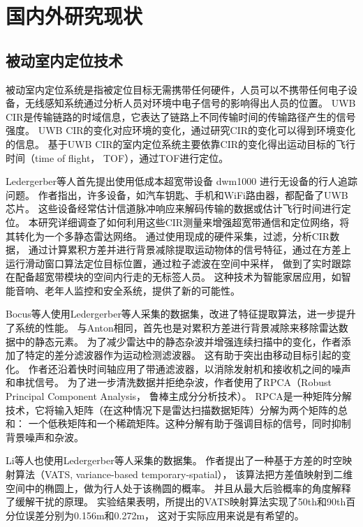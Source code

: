 \section{国内外研究现状}

\subsection{被动室内定位技术}
被动室内定位系统是指被定位目标无需携带任何硬件，人员可以不携带任何电子设备，无线感知系统通过分析人员对环境中电子信号的影响得出人员的位置。
UWB CIR是传输链路的时域信息，它表达了链路上不同传输时间的传输路径产生的信号强度。
UWB CIR的变化对应环境的变化，通过研究CIR的变化可以得到环境变化的信息。
基于UWB CIR的室内定位系统主要依靠CIR的变化得出运动目标的飞行时间（time of flight， TOF），通过TOF进行定位。

Ledergerber等人\cite{Ledergerber}首先提出使用低成本超宽带设备 dwm1000 进行无设备的行人追踪问题。
作者指出，许多设备，如汽车钥匙、手机和WiFi路由器，都配备了UWB芯片。
这些设备经常估计信道脉冲响应来解码传输的数据或估计飞行时间进行定位。
本研究详细调查了如何利用这些CIR测量来增强超宽带通信和定位网络，将其转化为一个多静态雷达网络。
通过使用现成的硬件采集，过滤，分析CIR数据，
通过计算累积方差并进行背景减除提取运动物体的信号特征，通过在方差上运行滑动窗口算法定位目标位置，通过粒子滤波在空间中采样，
做到了实时跟踪在配备超宽带模块的空间内行走的无标签人员。
这种技术为智能家居应用，如智能音响、老年人监控和安全系统，提供了新的可能性。

Bocus等人\cite{Bocus2021}使用Ledergerber等人采集的数据集，改进了特征提取算法，进一步提升了系统的性能。
与Anton相同，首先也是对累积方差进行背景减除来移除雷达数据中的静态元素。
为了减少雷达中的静态杂波并增强连续扫描中的变化，作者添加了特定的差分滤波器作为运动检测滤波器。
这有助于突出由移动目标引起的变化。
作者还沿着快时间轴应用了带通滤波器，以消除发射机和接收机之间的噪声和串扰信号。
为了进一步清洗数据并拒绝杂波，作者使用了RPCA（Robust Principal Component Analysis， 鲁棒主成分分析技术）。
RPCA是一种矩阵分解技术，它将输入矩阵（在这种情况下是雷达扫描数据矩阵）分解为两个矩阵的总和：
一个低秩矩阵和一个稀疏矩阵。这种分解有助于强调目标的信号，同时抑制背景噪声和杂波。

Li\cite{VATS}等人也使用Ledergerber等人采集的数据集。
作者提出了一种基于方差的时空映射算法（VATS, variance-based temporary-spatial），
该算法把方差值映射到二维空间中的椭圆上，做为行人处于该椭圆的概率。
并且从最大后验概率的角度解释了缓解干扰的原理。
实验结果表明，所提出的VATS映射算法实现了50th和90th百分位误差分别为0.156m和0.272m，
这对于实际应用来说是有希望的。

